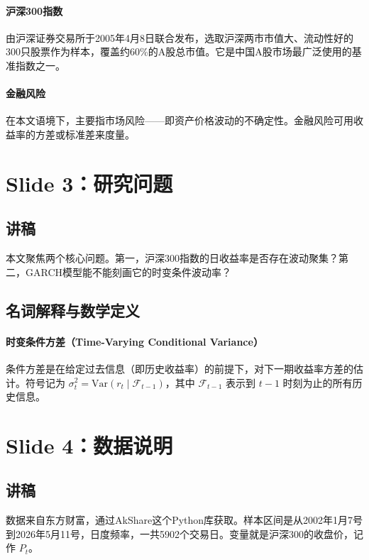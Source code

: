 \documentclass[11pt,a4paper]{article}
\begin{document}
\paragraph{沪深300指数} 由沪深证券交易所于2005年4月8日联合发布，选取沪深两市市值大、流动性好的300只股票作为样本，覆盖约60\%的A股总市值。它是中国A股市场最广泛使用的基准指数之一。

\paragraph{金融风险} 在本文语境下，主要指市场风险——即资产价格波动的不确定性。金融风险可用收益率的方差或标准差来度量。

\newpage
\section*{Slide 3：研究问题}

\subsection*{讲稿}
本文聚焦两个核心问题。第一，沪深300指数的日收益率是否存在波动聚集？第二，GARCH模型能不能刻画它的时变条件波动率？

\subsection*{名词解释与数学定义}

\paragraph{时变条件方差（Time-Varying Conditional Variance）} 条件方差是在给定过去信息（即历史收益率）的前提下，对下一期收益率方差的估计。符号记为 \(\sigma_t^2 = \text{Var}(r_t \mid \mathcal{F}_{t-1})\)，其中 \(\mathcal{F}_{t-1}\) 表示到 \(t-1\) 时刻为止的所有历史信息。

\newpage
\section*{Slide 4：数据说明}

\subsection*{讲稿}
数据来自东方财富，通过AkShare这个Python库获取。样本区间是从2002年1月7号到2026年5月11号，日度频率，一共5902个交易日。变量就是沪深300的收盘价，记作 \(P_t\)。
\end{document}
